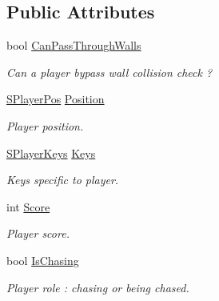 \subsection*{Public Attributes}
\begin{DoxyCompactItemize}
\item 
\hypertarget{struct_chase_game_1_1_s_player_state_acd7030969c414605901e551171078bb1}{bool \hyperlink{struct_chase_game_1_1_s_player_state_acd7030969c414605901e551171078bb1}{Can\-Pass\-Through\-Walls}}\label{struct_chase_game_1_1_s_player_state_acd7030969c414605901e551171078bb1}

\begin{DoxyCompactList}\small\item\em Can a player bypass wall collision check ? \end{DoxyCompactList}\item 
\hypertarget{struct_chase_game_1_1_s_player_state_a0a68b95a4255f2a543675f88b00847b4}{\hyperlink{struct_chase_game_1_1_s_player_pos}{S\-Player\-Pos} \hyperlink{struct_chase_game_1_1_s_player_state_a0a68b95a4255f2a543675f88b00847b4}{Position}}\label{struct_chase_game_1_1_s_player_state_a0a68b95a4255f2a543675f88b00847b4}

\begin{DoxyCompactList}\small\item\em Player position. \end{DoxyCompactList}\item 
\hypertarget{struct_chase_game_1_1_s_player_state_a3fc9ce0322ed28ff9c401983d91c69f2}{\hyperlink{struct_chase_game_1_1_s_player_keys}{S\-Player\-Keys} \hyperlink{struct_chase_game_1_1_s_player_state_a3fc9ce0322ed28ff9c401983d91c69f2}{Keys}}\label{struct_chase_game_1_1_s_player_state_a3fc9ce0322ed28ff9c401983d91c69f2}

\begin{DoxyCompactList}\small\item\em Keys specific to player. \end{DoxyCompactList}\item 
\hypertarget{struct_chase_game_1_1_s_player_state_ac59e6b76a6e5303dbeef6a6b4fbca95d}{int \hyperlink{struct_chase_game_1_1_s_player_state_ac59e6b76a6e5303dbeef6a6b4fbca95d}{Score}}\label{struct_chase_game_1_1_s_player_state_ac59e6b76a6e5303dbeef6a6b4fbca95d}

\begin{DoxyCompactList}\small\item\em Player score. \end{DoxyCompactList}\item 
\hypertarget{struct_chase_game_1_1_s_player_state_a2574de666d4744daefd7824b1c3c809f}{bool \hyperlink{struct_chase_game_1_1_s_player_state_a2574de666d4744daefd7824b1c3c809f}{Is\-Chasing}}\label{struct_chase_game_1_1_s_player_state_a2574de666d4744daefd7824b1c3c809f}

\begin{DoxyCompactList}\small\item\em Player role \-: chasing or being chased. \end{DoxyCompactList}\end{DoxyCompactItemize}


